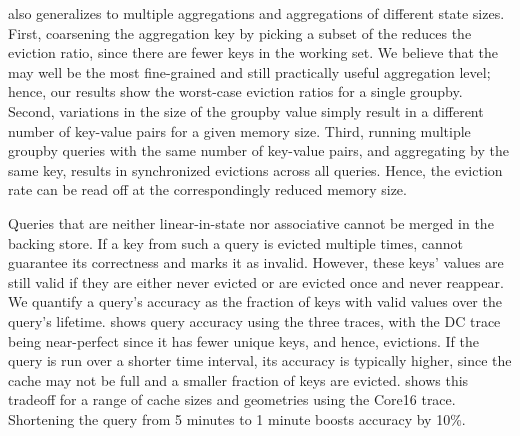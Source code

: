  also generalizes to multiple aggregations and aggregations
of different state sizes. 
First, coarsening the
aggregation key by picking a subset of the \txtftuple reduces the eviction
ratio, since there are fewer keys in the working set. We believe that the
\txtftuple may well be the most fine-grained and still practically useful
aggregation level; hence, our results show the worst-case eviction ratios for a
single {\ct groupby}.  Second, variations in the size of the {\ct groupby}
value simply result in a different number of key-value pairs for a given memory
size. Third, running multiple {\ct groupby} queries with the same number of
key-value pairs, and aggregating by the same key, results in synchronized
evictions across all queries. Hence, the eviction rate can be read off
 at the correspondingly reduced memory size.


Queries that are neither linear-in-state nor associative cannot be merged in
the backing store. If a key from such a query is evicted multiple times,
\TheSystem cannot guarantee its correctness and marks it as invalid. However,
these keys' values are still valid if they are either never evicted or are
evicted once and never reappear. We quantify a query's accuracy as the
fraction of keys with valid values over the query's lifetime.
 shows query accuracy using the three traces, with the DC
trace being near-perfect since it has fewer unique keys, and hence, evictions.
If the query is run over a shorter time interval, its accuracy is typically
higher, since the cache may not be full and a smaller fraction of keys are
evicted.   shows this tradeoff for a range of cache sizes
and geometries using the Core16 trace.  Shortening the query from 5 minutes to
1 minute boosts accuracy by 10\%.

